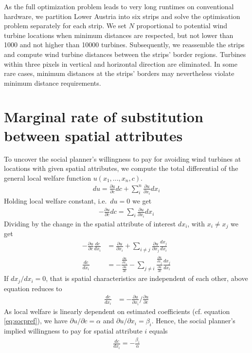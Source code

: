 \documentclass[review, a4paper, 12pt, authoryear, times]{elsarticle}
\begin{document}
As the full optimization problem leads to very long runtimes on conventional hardware, we partition Lower Austria into six strips and solve the optimisation problem separately for each strip.
We set $N$ proportional to potential wind turbine locations when minimum distances are respected, but not lower than \num{1000} and not higher than \num{10000} turbines.
Subsequently, we reassemble the strips and compute wind turbine distances between the strips' border regions. 
Turbines within three pixels in vertical and horizontal direction are eliminated. 
In some rare cases, minimum distances at the strips' borders may nevertheless violate minimum distance requirements.

\section{Marginal rate of substitution between spatial attributes} \label{app:marginal-rate-substitution}
To uncover the social planner's willingness to pay for avoiding wind turbines at locations with given spatial attributes, we compute the total differential of the general local welfare function $u(x_1, ..., x_n, c)$.
\begin{align*}
    d u = \frac{\partial u}{\partial c} d c + \sum_{i}^{n} \frac{\partial u}{\partial x_i} d x_i
\end{align*}
Holding local welfare constant, i.e.\ $d u = 0$ we get
\begin{align*}
    - \frac{\partial u}{\partial c} d c = \sum_{i} \frac{\partial u}{\partial x_i} d x_i
\end{align*}
Dividing by the change in the spatial attribute of interest $d x_i$, with $x_i \neq x_j$ we get
\begin{align*}
    - \frac{\partial u}{\partial c} \frac{d c}{d x_i} &= \frac{\partial u}{\partial x_i} + \sum_{i \neq j} \frac{\partial u}{\partial x_j} \frac{d x_j}{d x_i} \\
    \frac{d c}{d x_i} &= -\frac{\frac{\partial u}{\partial x_i}}{\frac{\partial u}{\partial c}} - \sum_{j \neq i} \frac{\frac{\partial u}{\partial x_j}}{\frac{\partial u}{\partial c}} \frac{d x_j}{d x_i}
\end{align*}
If $dx_j / dx_i = 0$, that is spatial characteristics are independent of each other, above equation reduces to
\begin{align*}
    \frac{d c}{d x_i} &= -\frac{\partial u}{\partial x_i} / \frac{\partial u}{\partial c}
\end{align*}
As local welfare is linearly dependent on estimated coefficients (cf. equation \eqref{eq:socpref}), we have $\partial u / \partial c = \alpha$ and $\partial u / \partial x_i = \beta_i$.
Hence, the social planner's implied willingness to pay for spatial attribute $i$ equals
\begin{align}
    \frac{d c}{dx_i} = - \frac{\beta_i}{\alpha}
\end{align}
\end{document}
